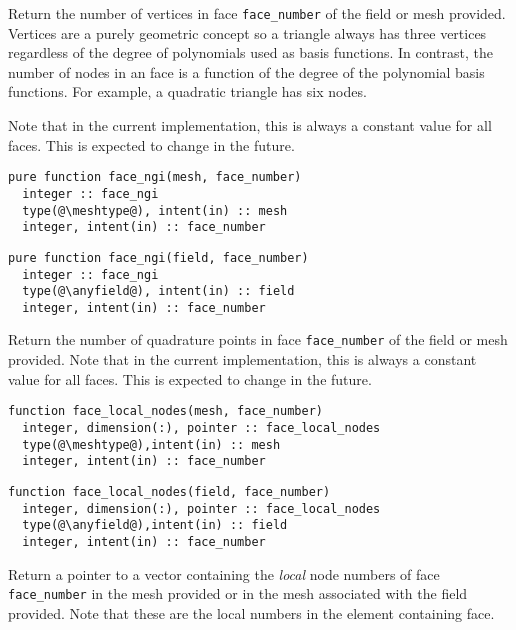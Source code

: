 \documentclass[a4paper, 11pt]{book}
\begin{document}
Return the number of vertices in face \lstinline+face_number+ of the field
or mesh provided. Vertices are a purely geometric concept so a triangle
always has three vertices regardless of the degree of polynomials used as 
basis functions. In contrast, the number of nodes in an face is a
function of the degree of the polynomial basis functions. For example, a
quadratic triangle has six nodes.

Note that in the current implementation, this is always a
constant value for all faces. This is expected to change in the future.



\begin{lstlisting}
pure function face_ngi(mesh, face_number)
  integer :: face_ngi
  type(@\meshtype@), intent(in) :: mesh
  integer, intent(in) :: face_number
\end{lstlisting}

\begin{lstlisting}
pure function face_ngi(field, face_number)
  integer :: face_ngi
  type(@\anyfield@), intent(in) :: field
  integer, intent(in) :: face_number
\end{lstlisting}

Return the number of quadrature points in face \lstinline+face_number+ of the field
or mesh provided. Note that in the current implementation, this is always a
constant value for all faces. This is expected to change in the future.


\begin{lstlisting}
function face_local_nodes(mesh, face_number)
  integer, dimension(:), pointer :: face_local_nodes
  type(@\meshtype@),intent(in) :: mesh
  integer, intent(in) :: face_number  
\end{lstlisting}

\begin{lstlisting}
function face_local_nodes(field, face_number)
  integer, dimension(:), pointer :: face_local_nodes
  type(@\anyfield@),intent(in) :: field
  integer, intent(in) :: face_number  
\end{lstlisting}

Return a pointer to a vector containing the \emph{local} node numbers of
face \lstinline+face_number+ in the  mesh provided or in the mesh
associated with the field provided. Note that these are the local numbers in
the element containing face.
\end{document}
